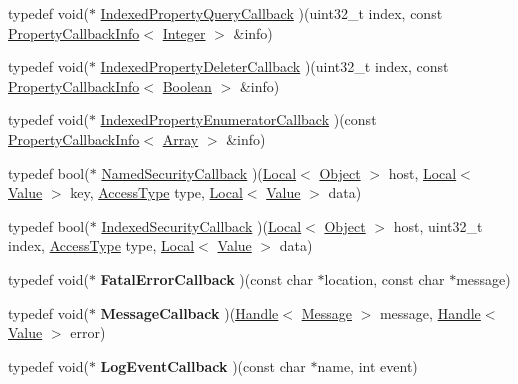 \begin{DoxyCompactItemize}
\item 
typedef void($\ast$ \hyperlink{namespacev8_af3c68ca291993f86484012c6789e2d6b}{Indexed\-Property\-Query\-Callback} )(uint32\-\_\-t index, const \hyperlink{classv8_1_1PropertyCallbackInfo}{Property\-Callback\-Info}$<$ \hyperlink{classv8_1_1Integer}{Integer} $>$ \&info)
\item 
typedef void($\ast$ \hyperlink{namespacev8_a7418cfa2330fbb54371d5cb883f4f974}{Indexed\-Property\-Deleter\-Callback} )(uint32\-\_\-t index, const \hyperlink{classv8_1_1PropertyCallbackInfo}{Property\-Callback\-Info}$<$ \hyperlink{classv8_1_1Boolean}{Boolean} $>$ \&info)
\item 
typedef void($\ast$ \hyperlink{namespacev8_aa8e207afeba7b651331fd3a11624630a}{Indexed\-Property\-Enumerator\-Callback} )(const \hyperlink{classv8_1_1PropertyCallbackInfo}{Property\-Callback\-Info}$<$ \hyperlink{classv8_1_1Array}{Array} $>$ \&info)
\item 
typedef bool($\ast$ \hyperlink{namespacev8_a43a0aeee2c3f33b123957ec1273c87db}{Named\-Security\-Callback} )(\hyperlink{classv8_1_1Local}{Local}$<$ \hyperlink{classv8_1_1Object}{Object} $>$ host, \hyperlink{classv8_1_1Local}{Local}$<$ \hyperlink{classv8_1_1Value}{Value} $>$ key, \hyperlink{namespacev8_add8bef6469c5b94706584124e610046c}{Access\-Type} type, \hyperlink{classv8_1_1Local}{Local}$<$ \hyperlink{classv8_1_1Value}{Value} $>$ data)
\item 
typedef bool($\ast$ \hyperlink{namespacev8_ad216c79f4f23bceefdb1469ad4ee65cd}{Indexed\-Security\-Callback} )(\hyperlink{classv8_1_1Local}{Local}$<$ \hyperlink{classv8_1_1Object}{Object} $>$ host, uint32\-\_\-t index, \hyperlink{namespacev8_add8bef6469c5b94706584124e610046c}{Access\-Type} type, \hyperlink{classv8_1_1Local}{Local}$<$ \hyperlink{classv8_1_1Value}{Value} $>$ data)
\item 
\hypertarget{namespacev8_a87341086742fc9145716651b6b8c4cae}{typedef void($\ast$ {\bfseries Fatal\-Error\-Callback} )(const char $\ast$location, const char $\ast$message)}\label{namespacev8_a87341086742fc9145716651b6b8c4cae}

\item 
\hypertarget{namespacev8_adc576a518b74173514311092880bf9f6}{typedef void($\ast$ {\bfseries Message\-Callback} )(\hyperlink{classv8_1_1Handle}{Handle}$<$ \hyperlink{classv8_1_1Message}{Message} $>$ message, \hyperlink{classv8_1_1Handle}{Handle}$<$ \hyperlink{classv8_1_1Value}{Value} $>$ error)}\label{namespacev8_adc576a518b74173514311092880bf9f6}

\item 
\hypertarget{namespacev8_a950fe41928f21d5a4b406b4009950b40}{typedef void($\ast$ {\bfseries Log\-Event\-Callback} )(const char $\ast$name, int event)}\label{namespacev8_a950fe41928f21d5a4b406b4009950b40}


\end{DoxyCompactItemize}
